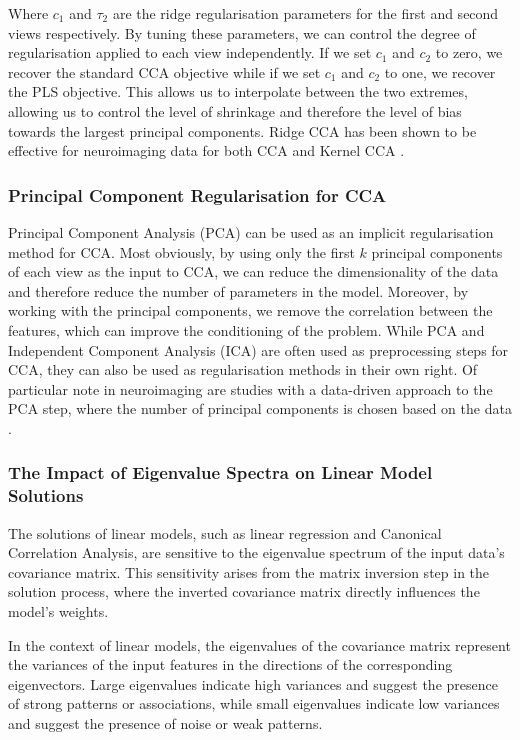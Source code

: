 Where $c_1$ and $\tau_2$ are the ridge regularisation parameters for the first and second views respectively.
By tuning these parameters, we can control the degree of regularisation applied to each view independently.
If we set $c_1$ and $c_2$ to zero, we recover the standard CCA objective while if we set $c_1$ and $c_2$ to one, we recover the PLS objective.
This allows us to interpolate between the two extremes, allowing us to control the level of shrinkage and therefore the level of bias towards the largest principal components. Ridge CCA has been shown to be effective for neuroimaging data for both CCA \citep{tenenhaus2011regularized, tuzhilina2023canonical, hardoon2004canonical} and Kernel CCA \citep{hardoon2007unsupervised}.

\subsubsection{Principal Component Regularisation for CCA} 
Principal Component Analysis (PCA) can be used as an implicit regularisation method for CCA. Most obviously, by using only the first \( k \) principal components of each view as the input to CCA, we can reduce the dimensionality of the data and therefore reduce the number of parameters in the model.
Moreover, by working with the principal components, we remove the correlation between the features, which can improve the conditioning of the problem.
While PCA and Independent Component Analysis (ICA) are often used as preprocessing steps for CCA, they can also be used as regularisation methods in their own right.
Of particular note in neuroimaging are studies with a data-driven approach to the PCA step, where the number of principal components is chosen based on the data \citep{liu2022improved, mihalik_canonical_2022}.

\subsubsection{The Impact of Eigenvalue Spectra on Linear Model Solutions}

The solutions of linear models, such as linear regression and Canonical Correlation Analysis, are sensitive to the eigenvalue spectrum of the input data's covariance matrix.
This sensitivity arises from the matrix inversion step in the solution process, where the inverted covariance matrix directly influences the model's weights.

In the context of linear models, the eigenvalues of the covariance matrix represent the variances of the input features in the directions of the corresponding eigenvectors.
Large eigenvalues indicate high variances and suggest the presence of strong patterns or associations, while small eigenvalues indicate low variances and suggest the presence of noise or weak patterns.


